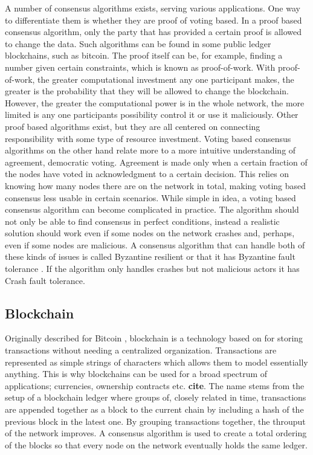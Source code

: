 \documentclass[english, biblatex, digitaloutput]{kththesis}
\begin{document}
A number of consensus algorithms exists, serving various applications. One way to differentiate them is whether they are proof of voting based. In a proof based consensus algorithm, only the party that has provided a certain proof is allowed to change the data. Such algorithms can be found in some public ledger blockchains, such as bitcoin. The proof itself can be, for example, finding a number given certain constraints, which is known as proof-of-work. With proof-of-work, the greater computational investment any one participant makes, the greater is the probability that they will be allowed to change the blockchain. However, the greater the computational power is in the whole network, the more limited is any one participants possibility control it or use it maliciously. Other proof based algorithms exist, but they are all centered on connecting responsibility with some type of resource investment. Voting based consensus algorithms on the other hand relate more to a more intuitive understanding of agreement, \ie democratic voting. Agreement is made only when a certain fraction of the nodes have voted in acknowledgment to a certain decision. This relies on knowing how many nodes there are on the network in total, making voting based consensus less usable in certain scenarios. While simple in idea, a voting based consensus algorithm can become complicated in practice. The algorithm should not only be able to find consensus in perfect conditions, instead a realistic solution should work even if some nodes on the network crashes and, perhaps, even if some nodes are malicious. A consensus algorithm that can handle both of these kinds of issues is called Byzantine resilient \cite{goos_consensus_1983} or that it has Byzantine fault tolerance \cite{nguyen_survey_2018}. If the algorithm only handles crashes but not malicious actors it has Crash fault tolerance.


\subsection{Blockchain}

Originally described for Bitcoin \cite{nakamoto_bitcoin_nodate, di_pierro_what_2017}, blockchain is a technology based on  for storing transactions without needing a centralized organization. Transactions are represented as simple strings of characters which allows them to model essentially anything. This is why blockchains can be used for a broad spectrum of applications; \eg currencies, ownership contracts etc. \textbf{cite}. The name stems from the setup of a blockchain ledger where groups of, closely related in time, transactions are appended together as a block to the current chain by including a hash of the previous block in the latest one. By grouping transactions together, the throuput of the network improves. A consensus algorithm is used to create a total ordering of the blocks so that every node on the network eventually holds the same ledger.
\end{document}
